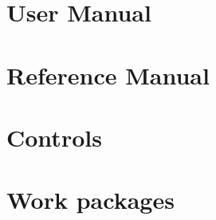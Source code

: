 \documentclass{dabcclass}
\begin{document}
\chapter{User Manual}
 \cleardoublepage
\chapter{Reference Manual}
 \cleardoublepage
\chapter{Controls}
 \cleardoublepage
\chapter{Work packages}
 \cleardoublepage

\thispagestyle{empty}
 \cleardoublepage

\end{document}
